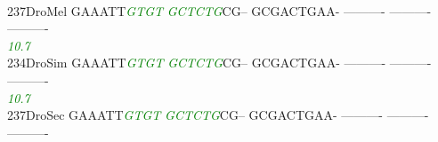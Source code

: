 \documentclass[11pt,twoside,reqno,a4paper]{article}
\begin{document}
{\\
237\hspace*{1\charwidth}DroMel	GAAATT\textit{\textcolor{Green}{G}}\textit{\textcolor{Green}{T}}\textit{\textcolor{Green}{G}}\textit{\textcolor{Green}{T}}	\textit{\textcolor{Green}{G}}\textit{\textcolor{Green}{C}}\textit{\textcolor{Green}{T}}\textit{\textcolor{Green}{C}}\textit{\textcolor{Green}{T}}\textit{\textcolor{Green}{G}}CG--	GCGACTGAA-	----------	----------	----------	\\
\hspace*{4\charwidth}\hspace*{7\charwidth}\hspace*{6\charwidth}\textit{\textcolor{Green}{10.7}}\hspace*{1\charwidth}\hspace*{1\charwidth}\hspace*{1\charwidth}\hspace*{1\charwidth}\hspace*{1\charwidth}\hspace*{1\charwidth}\\
234\hspace*{1\charwidth}DroSim	GAAATT\textit{\textcolor{Green}{G}}\textit{\textcolor{Green}{T}}\textit{\textcolor{Green}{G}}\textit{\textcolor{Green}{T}}	\textit{\textcolor{Green}{G}}\textit{\textcolor{Green}{C}}\textit{\textcolor{Green}{T}}\textit{\textcolor{Green}{C}}\textit{\textcolor{Green}{T}}\textit{\textcolor{Green}{G}}CG--	GCGACTGAA-	----------	----------	----------	\\
\hspace*{4\charwidth}\hspace*{7\charwidth}\hspace*{6\charwidth}\textit{\textcolor{Green}{10.7}}\hspace*{1\charwidth}\hspace*{1\charwidth}\hspace*{1\charwidth}\hspace*{1\charwidth}\hspace*{1\charwidth}\hspace*{1\charwidth}\\
237\hspace*{1\charwidth}DroSec	GAAATT\textit{\textcolor{Green}{G}}\textit{\textcolor{Green}{T}}\textit{\textcolor{Green}{G}}\textit{\textcolor{Green}{T}}	\textit{\textcolor{Green}{G}}\textit{\textcolor{Green}{C}}\textit{\textcolor{Green}{T}}\textit{\textcolor{Green}{C}}\textit{\textcolor{Green}{T}}\textit{\textcolor{Green}{G}}CG--	GCGACTGAA-	----------	----------	----------	\\
}
\end{document}
